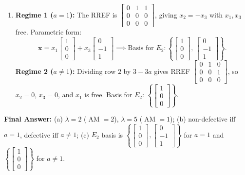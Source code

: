 \documentclass[11pt, letterpaper]{article}
\theoremstyle{definition}
\theoremstyle{remark}
\begin{document}
\begin{enumerate}[label=(\alph*)]
    \item \textbf{Regime 1 ($a = 1$):} The RREF is $\begin{bmatrix} 0 & 1 & 1 \\ 0 & 0 & 0 \\ 0 & 0 & 0 \end{bmatrix}$, giving $x_2 = -x_3$ with $x_1, x_3$ free. Parametric form:
    \[
    \mathbf{x} = x_1 \begin{bmatrix} 1 \\ 0 \\ 0 \end{bmatrix} + x_3 \begin{bmatrix} 0 \\ -1 \\ 1 \end{bmatrix} \implies \text{Basis for } E_2: \left\{ \begin{bmatrix} 1 \\ 0 \\ 0 \end{bmatrix},\ \begin{bmatrix} 0 \\ -1 \\ 1 \end{bmatrix} \right\}.
    \]
    \textbf{Regime 2 ($a \neq 1$):} Dividing row $2$ by $3 - 3a$ gives RREF $\begin{bmatrix} 0 & 1 & 0 \\ 0 & 0 & 1 \\ 0 & 0 & 0 \end{bmatrix}$, so $x_2 = 0$, $x_3 = 0$, and $x_1$ is free. Basis for $E_2$: $\left\{ \begin{bmatrix} 1 \\ 0 \\ 0 \end{bmatrix} \right\}$.
\end{enumerate}
\textbf{Final Answer:} (a) $\lambda = 2$ ($\operatorname{AM}=2$), $\lambda = 5$ ($\operatorname{AM}=1$); (b) non-defective iff $a = 1$, defective iff $a \neq 1$; (c) $E_2$ basis is $\left\{ \begin{bmatrix} 1 \\ 0 \\ 0 \end{bmatrix}, \begin{bmatrix} 0 \\ -1 \\ 1 \end{bmatrix} \right\}$ for $a = 1$ and $\left\{ \begin{bmatrix} 1 \\ 0 \\ 0 \end{bmatrix} \right\}$ for $a \neq 1$.
\end{document}
